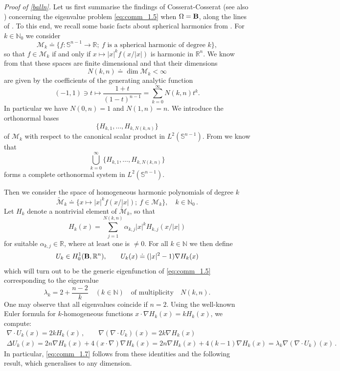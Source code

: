 \documentclass[11pt]{article}
\theoremstyle{plain}
\theoremstyle{definition}
\numberwithin{equation}{section}
\newcommand{\R}{\mathbb{R}}
\newcommand{\N}{\mathbb{N}}
\newcommand{\B}{{\bf B}}
\begin{document}
\noindent
\emph{Proof of \eqref{balln}.} Let us first summarise the findings of Cosserat-Cosserat \cite{Cosserat_18987,Cosserat_18986} (see also \cite{Cosserat_1896}) concerning the eigenvalue problem \eqref{eq:comm_1.5} when $\Omega=\B$, along the lines of \cite{Simader_vonWahl_2006}.
To this end, we recall some basic facts about spherical harmonics from \cite[Chapter 5, Section 5]{Sauvigny_PDE_1}. For $k\in \mathbb{N}_0$ we consider
$$
{\mathcal M}_k\doteq\{f:\mathbb{S}^{n-1}\to \R;\ f\mbox{ is a spherical harmonic of degree }k\},
$$	
so that $f\in{\mathcal M}_k$ if and only if $x\mapsto |x|^k f(x/|x|)$ is harmonic in $\mathbb{R}^n$. We know from \cite[Theorem 5.5]{Sauvigny_PDE_1} that these spaces are finite dimensional
and that their dimensions
$$
N(k,n)\doteq\operatorname{dim}{\mathcal M}_k <\infty
$$
are given by the coefficients of the generating analytic function
$$
(-1,1)\ni t\mapsto \frac{1+t}{(1-t)^{n-1}}=\sum^\infty_{k=0}N(k,n)t^k.
$$	
In particular we have $N(0,n)=1$ and $N(1,n)=n$.
We introduce the orthonormal bases
\begin{equation}\label{basis}
	\{H_{k,1},\ldots,H_{k,N(k,n)}\}
\end{equation}
of ${\mathcal M}_k$ with respect to the canonical scalar product in $L^2(\mathbb{S}^{n-1})$. From \cite[Theorem 5.6]{Sauvigny_PDE_1} we know that
$$
\bigcup_{k=0}^\infty \{H_{k,1},\ldots,H_{k,N(k,n)}\}
$$
forms a complete orthonormal system in $L^2(\mathbb{S}^{n-1})$.\par
Then we consider the space of homogeneous harmonic polynomials  of degree $k$
$$
\widetilde{\mathcal M}_k\doteq\{x\mapsto |x|^k f(x/|x|);\ f\in {\mathcal M}_k\},\quad k\in \N_0\, .
$$
Let $H_k$ denote a nontrivial element of $\widetilde{\mathcal M}_k$, so that
$$
H_k(x) = \sum_{j=1}^{N(k,n)} \alpha_{k,j} |x|^k H_{k,j}(x/|x|)
$$
for suitable $\alpha_{k,j}\in\R$, where at least one is $\not=0$. For all $k\in \N$ we then define
\begin{equation}\label{eq:comm_1.6}
	U_k\in H^1_0 (\B,\R^n),\qquad U_k(x)\doteq(|x|^2-1)\nabla H_k(x)
\end{equation}
which will turn out to be the generic eigenfunction of \eqref{eq:comm_1.5} corresponding to the eigenvalue
\begin{equation}\label{eq:comm_1.7}
	\lambda_k =2+\frac{n-2}{k}\quad (k\in\N)\quad \mbox{of multiplicity}\quad N(k,n).
\end{equation}
One may observe that all eigenvalues coincide if $n=2$. Using the well-known Euler formula for $k$-homogeneous functions $x\cdot \nabla H_k (x) = kH_k(x)$, we compute:
$$
\begin{array}{cc}
	\nabla\cdot U_k(x)=2k H_k(x)\, ,\qquad\nabla \left( \nabla \cdot U_k \right)(x) = 2k \nabla H_k(x)\\
	\Delta U_k(x)=2n \nabla H_k(x) +4(x\cdot \nabla) \nabla H_k(x)
	=2n \nabla H_k(x) +4(k-1) \nabla H_k(x)=\lambda_k \nabla \left( \nabla \cdot U_k \right)(x)\, .
\end{array}
$$
In particular, \eqref{eq:comm_1.7} follows from these identities and the following result,
which generalises \cite[Theorem 2]{Velte_LNM1431_1990} to any dimension.
\end{document}
